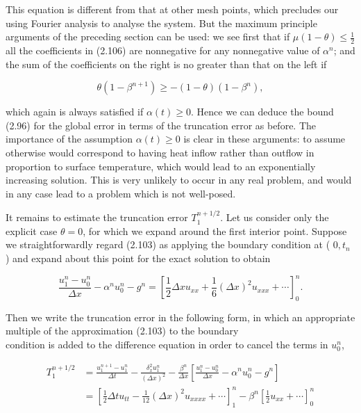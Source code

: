 \documentclass[10pt]{article}
\begin{document}
This equation is different from that at other mesh points, which precludes our using Fourier analysis to analyse the system. But the maximum principle arguments of the preceding section can be used: we see first that if \(\mu(1-\theta) \leq \frac{1}{2}\) all the coefficients in (2.106) are nonnegative for any nonnegative value of \(\alpha^{n}\); and the sum of the coefficients on the right is no greater than that on the left if

\[
\theta\left(1-\beta^{n+1}\right) \geq-(1-\theta)\left(1-\beta^{n}\right),
\]

which again is always satisfied if \(\alpha(t) \geq 0\). Hence we can deduce the bound (2.96) for the global error in terms of the truncation error as before. The importance of the assumption \(\alpha(t) \geq 0\) is clear in these arguments: to assume otherwise would correspond to having heat inflow rather than outflow in proportion to surface temperature, which would lead to an exponentially increasing solution. This is very unlikely to occur in any real problem, and would in any case lead to a problem which is not well-posed.

It remains to estimate the truncation error \(T_{1}^{n+1 / 2}\). Let us consider only the explicit case \(\theta=0\), for which we expand around the first interior point. Suppose we straightforwardly regard (2.103) as applying the boundary condition at ( \(0, t_{n}\) ) and expand about this point for the exact solution to obtain

\[
\frac{u_{1}^{n}-u_{0}^{n}}{\Delta x}-\alpha^{n} u_{0}^{n}-g^{n}=\left[\frac{1}{2} \Delta x u_{x x}+\frac{1}{6}(\Delta x)^{2} u_{x x x}+\cdots\right]_{0}^{n} .
\]

Then we write the truncation error in the following form, in which an appropriate multiple of the approximation (2.103) to the boundary\\
condition is added to the difference equation in order to cancel the terms in \(u_{0}^{n}\),

\[
\begin{aligned}
T_{1}^{n+1 / 2} & =\frac{u_{1}^{n+1}-u_{1}^{n}}{\Delta t}-\frac{\delta_{x}^{2} u_{1}^{n}}{(\Delta x)^{2}}-\frac{\beta^{n}}{\Delta x}\left[\frac{u_{1}^{n}-u_{0}^{n}}{\Delta x}-\alpha^{n} u_{0}^{n}-g^{n}\right] \\
& =\left[\frac{1}{2} \Delta t u_{t t}-\frac{1}{12}(\Delta x)^{2} u_{x x x x}+\cdots\right]_{1}^{n}-\beta^{n}\left[\frac{1}{2} u_{x x}+\cdots\right]_{0}^{n}
\end{aligned}
\]
\end{document}

